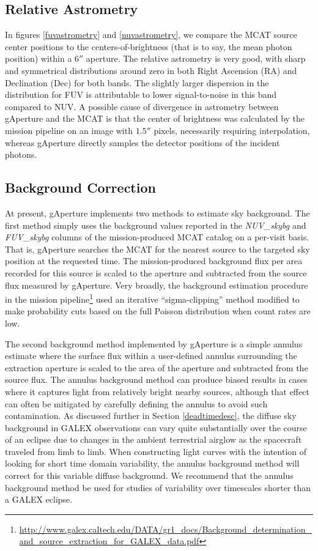 \documentclass[preprint]{aastex}
\begin{document}
\subsection{Relative Astrometry}
In figures \ref{fuvastrometry} and \ref{nuvastrometry}, we compare the MCAT source center positions to the centers-of-brightness (that is to say, the mean photon position) within a $6''$ aperture. The relative astrometry is very good, with sharp and symmetrical distributions around zero in both Right Ascension (RA) and Declination (Dec) for both bands. The slightly larger dispersion in the distribution for FUV is attributable to lower signal-to-noise in this band compared to NUV. A possible cause of divergence in astrometry between gAperture and the MCAT is that the center of brightness was calculated by the mission pipeline on an image with $1.5''$ pixels, necessarily requiring interpolation, whereas gAperture directly samples the detector positions of the incident photons.

\subsection{Background Correction}
\label{bgcorr}
At present, gAperture implements two methods to estimate sky background. The first method simply uses the background values reported in the \emph{NUV\_skybg} and \emph{FUV\_skybg} columns of the mission-produced MCAT catalog on a per-visit basis. That is, gAperture searches the MCAT for the nearest source to the targeted sky position at the requested time. The mission-produced background flux per area recorded for this source is scaled to the aperture and subtracted from the source flux measured by gAperture. Very broadly, the background estimation procedure in the mission pipeline\footnote{\url{http://www.galex.caltech.edu/DATA/gr1_docs/Background_determination_and_source_extraction_for_GALEX_data.pdf}} used an iterative ``sigma-clipping'' method modified to make probability cuts based on the full Poisson distribution when count rates are low.

The second background method implemented by gAperture is a simple annulus estimate where the surface flux within a user-defined annulus surrounding the extraction aperture is scaled to the area of the aperture and subtracted from the source flux. The annulus background method can produce biased results in cases where it captures light from relatively bright nearby sources, although that effect can often be mitigated by carefully defining the annulus to avoid such contamination. As discussed further in Section \ref{deadtimedesc}, the diffuse sky background in GALEX observations can vary quite substantially over the course of an eclipse due to changes in the ambient terrestrial airglow as the spacecraft traveled from limb to limb. When constructing light curves with the intention of looking for short time domain variability, the annulus background method will correct for this variable diffuse background. We recommend that the annulus background method be used for studies of variability over timescales shorter than a GALEX eclipse.
\end{document}
